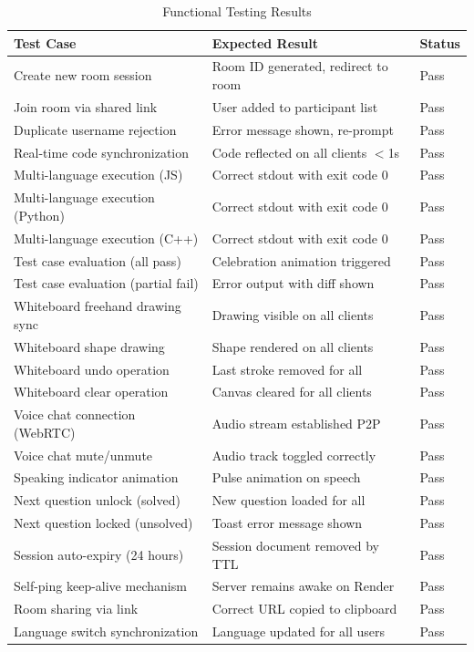 \begin{table}[H]
\centering
\caption{Functional Testing Results}
\label{tab:testresults}
\begin{reporttable}
\begin{tabular}{@{} p{4.5cm} p{5cm} l @{}}
\toprule
\textbf{Test Case} & \textbf{Expected Result} & \textbf{Status} \\
\midrule
Create new room session & Room ID generated, redirect to room & Pass \\
Join room via shared link & User added to participant list & Pass \\
Duplicate username rejection & Error message shown, re-prompt & Pass \\
Real-time code synchronization & Code reflected on all clients $<$1s & Pass \\
Multi-language execution (JS) & Correct stdout with exit code 0 & Pass \\
Multi-language execution (Python) & Correct stdout with exit code 0 & Pass \\
Multi-language execution (C++) & Correct stdout with exit code 0 & Pass \\
Test case evaluation (all pass) & Celebration animation triggered & Pass \\
Test case evaluation (partial fail) & Error output with diff shown & Pass \\
Whiteboard freehand drawing sync & Drawing visible on all clients & Pass \\
Whiteboard shape drawing & Shape rendered on all clients & Pass \\
Whiteboard undo operation & Last stroke removed for all & Pass \\
Whiteboard clear operation & Canvas cleared for all clients & Pass \\
Voice chat connection (WebRTC) & Audio stream established P2P & Pass \\
Voice chat mute/unmute & Audio track toggled correctly & Pass \\
Speaking indicator animation & Pulse animation on speech & Pass \\
Next question unlock (solved) & New question loaded for all & Pass \\
Next question locked (unsolved) & Toast error message shown & Pass \\
Session auto-expiry (24 hours) & Session document removed by TTL & Pass \\
Self-ping keep-alive mechanism & Server remains awake on Render & Pass \\
Room sharing via link & Correct URL copied to clipboard & Pass \\
Language switch synchronization & Language updated for all users & Pass \\
\bottomrule
\end{tabular}
\end{reporttable}
\end{table}

